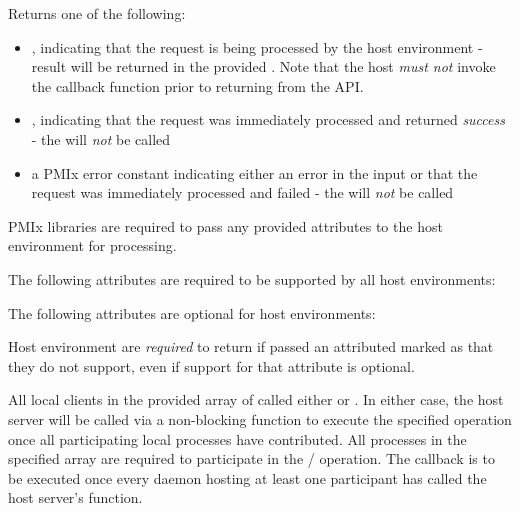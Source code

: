 Returns one of the following:

\begin{itemize}
    \item {}, indicating that the request is being processed by the host environment - result will be returned in the provided . Note that the host \emph{must not} invoke the callback function prior to returning from the \ac{API}.
    \item {}, indicating that the request was immediately processed and returned \textit{success} - the  will \textit{not} be called
    \item a PMIx error constant indicating either an error in the input or that the request was immediately processed and failed - the  will \textit{not} be called
\end{itemize}

\reqattrstart
\ac{PMIx} libraries are required to pass any provided attributes to the host environment for processing.

The following attributes are required to be supported by all host environments:


\reqattrend

\optattrstart
The following attributes are optional for host environments:


\optattrend

\advicermstart
Host environment are \textit{required} to return  if passed an attributed marked as  that they do not support, even if support for that attribute is optional.
\advicermend

\descr

All local clients in the provided array of  called either  or .
In either case, the host server will be called via a non-blocking function to execute the specified operation once all participating local processes have contributed.
All processes in the specified  array are required to participate in the / operation.
The callback is to be executed once every daemon hosting at least one participant has called the host server's  function.


